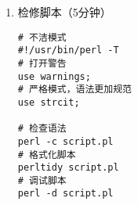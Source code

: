 \documentclass{TIJMUjiaoanLL}
\begin{document}
\begin{enumerate}
\begin{enumerate}
      \item while
    \vspace*{-10pt}
    \begin{figure}[h]
      \texttt{[image: c9.perl.while.01.png]}
      \texttt{[image: c9.perl.do.while.01.jpg]}
    \end{figure}
    \vspace*{-28pt}
    \begin{multicols}{2}
\begin{verbatim}
$i = 0;
# while
while ($i < 10) {
  print "$i\n";
  $i++;
}

# do-while
do {
  print "$i\n";
  $i = $i + 1;
} while ($i < 10);
\end{verbatim}
\end{multicols}
    \vspace*{-12pt}

      \item until
    \vspace*{-15pt}
    \begin{multicols}{2}
\begin{verbatim}
$i = 0;
# until
until ($i == 10) {
  print "$i\n";
  $i++;
}

# do-until
do {
  print "$i\n";
  $i++;
} until ($i == 10);
\end{verbatim}
\end{multicols}
    \vspace*{-25pt}
    \end{enumerate}

\otherTail
\newpage
\otherHeader

    \vspace*{-10pt}
    \begin{figure}[h]
      \centering
      \texttt{[image: c9.perl.until.01.png]}
      \qquad \qquad
      \texttt{[image: c9.perl.do.until.01.png]}
    \end{figure}
    \vspace*{-10pt}

  \item 检修脚本（5分钟）
    \vspace*{-10pt}
    \begin{multicols}{2}
\begin{verbatim}
# 不洁模式
#!/usr/bin/perl -T
# 打开警告
use warnings;
# 严格模式，语法更加规范
use strcit;

# 检查语法
perl -c script.pl
# 格式化脚本
perltidy script.pl
# 调试脚本
perl -d script.pl
\end{verbatim}
    \end{multicols}
    \vspace*{-20pt}


\end{enumerate}
\end{document}
